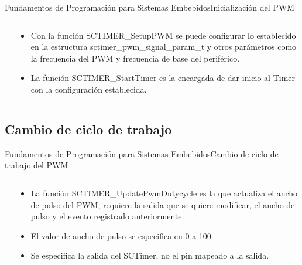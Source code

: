 \documentclass[aspectratio=169, xcolor=dvipsnames]{beamer}
\begin{document}
\begin{frame}{Fundamentos de Programación para Sistemas Embebidos}{Inicialización del PWM}
\begin{columns}
\begin{column}{0.5\textwidth}

\end{column}
\begin{column}{0.5\textwidth}
\begin{itemize}
    \item Con la función \textcolor{myblue}{SCTIMER\_SetupPWM} se puede configurar lo establecido en la estructura \textcolor{myblue}{sctimer\_pwm\_signal\_param\_t} y otros parámetros como la frecuencia del PWM y frecuencia de base del periférico.
    \item La función \textcolor{myblue}{SCTIMER\_StartTimer} es la encargada de dar inicio al Timer con la configuración establecida.
\end{itemize}
\end{column}
\end{columns}
\end{frame}

\subsection{Cambio de ciclo de trabajo}
\begin{frame}{Fundamentos de Programación para Sistemas Embebidos}{Cambio de ciclo de trabajo del PWM}
\begin{columns}
\begin{column}{0.5\textwidth}

\end{column}
\begin{column}{0.5\textwidth}
\begin{itemize}
    \item La función \textcolor{myblue}{SCTIMER\_UpdatePwmDutycycle} es la que actualiza el ancho de pulso del PWM, requiere la salida que se quiere modificar, el ancho de pulso y el evento registrado anteriormente.
    \item El valor de ancho de pulso se especifica en 0 a 100.
    \item Se especifica la salida del SCTimer, no el pin mapeado a la salida.
\end{itemize}
\end{column}
\end{columns}
\end{frame}
\end{document}
